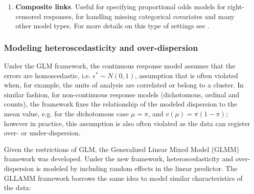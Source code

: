 \begin{enumerate}
\begin{enumerate}
		
		\item \textbf{Composite links}. Useful for specifying proportional odds models for right-censored responses, for handling missing categorical covariates and many other model types. For more details on this type of settings see \citet{Skrondal_et_al_2004b}.
	\end{enumerate}
	
	

	


\end{enumerate}

\subsubsection{Modeling heteroscedasticity and over-dispersion}

Under the GLM framework, the continuous response model assumes that the errors are homoscedastic, i.e. $\epsilon^{*} \sim N(0,1)$, assumption that is often violated when, for example, the units of analysis are correlated or belong to a cluster. In similar fashion, for non-continuous response models (dichotomous, ordinal and counts), the framework fixes the relationship of the modeled dispersion to the mean value, e.g. for the dichotomous case $\mu = \pi$, and $v(\mu) = \pi (1-\pi)$; however in practice, this assumption is also often violated as the data can register over- or under-dispersion. 

Given the restrictions of GLM, the Generalized Linear Mixed Model (GLMM) framework was developed. Under the new framework, heteroscedasticity and over-dispersion is modeled by including random effects in the linear predictor. The GLLAMM framework borrows the same idea to model similar characteristics of the data:

